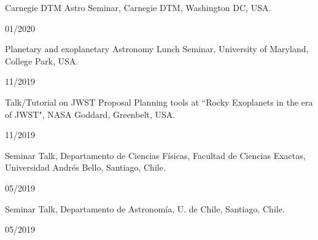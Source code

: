 \documentclass[12pt, a4paper]{article} %
\begin{document}
\begin{minipage}[t]{0.7\textwidth}
\begin{flushleft}%
  \setlength{\leftskip}{0.2cm}%
Carnegie DTM Astro Seminar, Carnegie DTM, Washington DC, USA.
\end{flushleft}
\end{minipage}
\begin{minipage}[t]{0.3\textwidth}
\hfill 01/2020
\end{minipage}
\vspace{0.2cm}

\begin{minipage}[t]{0.7\textwidth}
\begin{flushleft}%
  \setlength{\leftskip}{0.2cm}%
Planetary and exoplanetary Astronomy Lunch Seminar, University of Maryland, College Park, USA.
\end{flushleft}
\end{minipage}
\begin{minipage}[t]{0.3\textwidth}
\hfill 11/2019
\end{minipage}
\vspace{0.2cm}

\begin{minipage}[t]{0.7\textwidth}
\begin{flushleft}%
  \setlength{\leftskip}{0.2cm}%
Talk/Tutorial on JWST Proposal Planning tools at ``Rocky Exoplanets in the era of JWST", NASA Goddard, Greenbelt, USA.
\end{flushleft}
\end{minipage}
\begin{minipage}[t]{0.3\textwidth}
\hfill 11/2019
\end{minipage}
\vspace{0.2cm}

\begin{minipage}[t]{0.7\textwidth}
\begin{flushleft}%
  \setlength{\leftskip}{0.2cm}%
Seminar Talk, Departamento de Ciencias F\'isicas, Facultad de Ciencias
Exactas, Universidad Andr\'es Bello, Santiago, Chile.
\end{flushleft}
\end{minipage}
\begin{minipage}[t]{0.3\textwidth}
\hfill 05/2019
\end{minipage}
\vspace{0.2cm}


\begin{minipage}[t]{0.7\textwidth}
\begin{flushleft}%
  \setlength{\leftskip}{0.2cm}%
Seminar Talk, Departamento de Astronom\'ia, U. de Chile, Santiago, Chile.
\end{flushleft}
\end{minipage}
\begin{minipage}[t]{0.3\textwidth}
\hfill 05/2019
\end{minipage}
\vspace{0.2cm}
\end{document}
